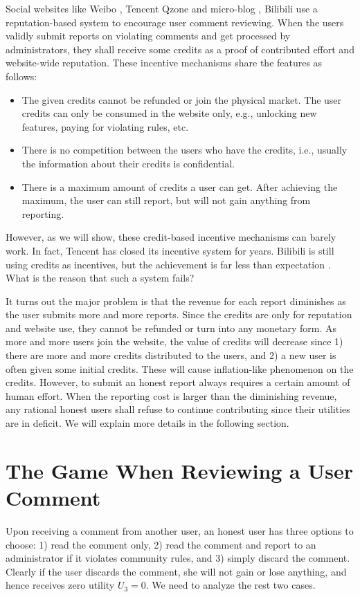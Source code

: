 \documentclass[12pt]{article}
\begin{document}
Social websites like Weibo \cite{WB}, Tencent Qzone \cite{QZ} and micro-blog \cite{TMB}, Bilibili \cite{BL} use a reputation-based system to encourage user comment reviewing.
When the users validly submit reports on violating comments and get processed by administrators, they shall receive some credits as a proof of contributed effort and website-wide reputation. These incentive mechanisms share the features as follows:
\begin{itemize}
\item The given credits cannot be refunded or join the physical market. The user credits can only be consumed in the website only, e.g., unlocking new features, paying for violating rules, etc.
\item There is no competition between the users who have the credits, i.e., usually the information about their credits is confidential.
\item There is a maximum amount of credits a user can get. After achieving the maximum, the user can still report, but will not gain anything from reporting.
\end{itemize}
However, as we will show, these credit-based incentive mechanisms can barely work. In fact, Tencent has closed its incentive system for years. Bilibili is still using credits as incentives, but the achievement is far less than expectation \cite{ZH16}. What is the reason that such a system fails?

It turns out the major problem is that the revenue for each report diminishes as the user submits more and more reports. Since the credits are only for reputation and website use, they cannot be refunded or turn into any monetary form. As more and more users join the website, the value of credits will decrease since 1) there are more and more credits distributed to the users, and 2) a new user is often given some initial credits. These will cause inflation-like phenomenon on the credits. However, to submit an honest report always requires a certain amount of human effort. When the reporting cost is larger than the diminishing revenue, any rational honest users shall refuse to continue contributing since their utilities are in deficit. We will explain more details in the following section.

\section{The Game When Reviewing a User Comment}
Upon receiving a comment from another user, an honest user has three options to choose: 1) read the comment only, 2) read the comment and report to an administrator if it violates community rules, and 3) simply discard the comment. Clearly if the user discards the comment, she will not gain or lose anything, and hence receives zero utility $U_3 = 0$. We need to analyze the rest two cases.
\end{document}
